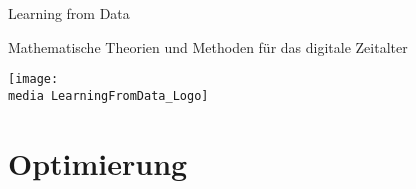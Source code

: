 \documentclass{newlayout}
\newcommand{\media}{media/}
\begin{document}
%
\setcounter{page}{3}

\setcounter{tocdepth}{1}
\tableofcontents

\setcounter{secnumdepth}{1}

\setcounter{page}{7}
\setcounter{chapter}{0}


\begin{coursetitle}
  \centerline{Learning from Data} 
  \bigskip
  \Large \centerline{Mathematische Theorien und Methoden für das digitale Zeitalter}
  \bigskip
 \texttt{[image: \\media LearningFromData\_Logo]}
 \label{fig:titelbild}
  \bigskip
\end{coursetitle}










\section{Optimierung}


% 







%
\end{document}
